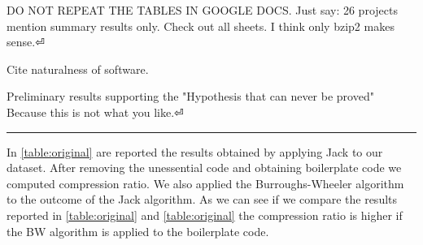 DO NOT REPEAT THE TABLES IN GOOGLE DOCS.
Just say: 26 projects mention summary results only.
Check out all sheets. I think only bzip2 makes sense.⏎

Cite naturalness of software.

Preliminary results supporting the
"Hypothesis that can never be proved"
Because this is not what you like.⏎

\hrule

In \cref{table:original} are reported the results obtained by applying Jack to
our dataset. After removing the unessential code and obtaining boilerplate
code we computed compression ratio. We also applied the Burroughs-Wheeler
algorithm to the outcome of the Jack algorithm. As we can see if we compare
the results reported in \cref{table:original} and \cref{table:original} the
compression ratio is higher if the BW algorithm is applied to the boilerplate
code.


